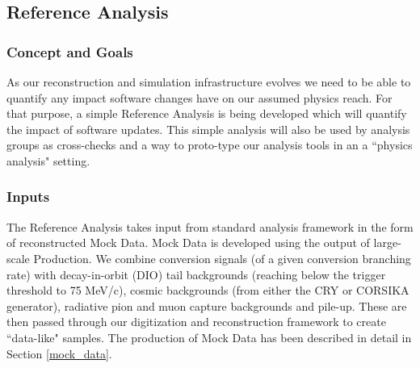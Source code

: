 \subsection{Reference Analysis}


\subsubsection{Concept and Goals}
As our reconstruction and simulation infrastructure evolves we need to be able to quantify any impact software changes have on our assumed physics reach. For that purpose, a simple Reference Analysis is being developed which will quantify the impact of software updates. This simple analysis will also be used by analysis groups as cross-checks and a way to proto-type our analysis tools in an a ``physics analysis" setting.

\subsubsection{Inputs}
The Reference Analysis takes input from standard analysis framework in the form of reconstructed Mock Data. Mock Data is developed using the output of large-scale Production. We combine conversion signals (of a given conversion branching rate) with decay-in-orbit (DIO) tail backgrounds (reaching below the trigger threshold to 75 MeV/c), cosmic backgrounds (from either the CRY or CORSIKA generator), radiative pion and muon capture backgrounds and pile-up. These are then passed through our digitization and reconstruction framework to create ``data-like" samples. The production of Mock Data has been described in detail in Section \ref{mock_data}.

